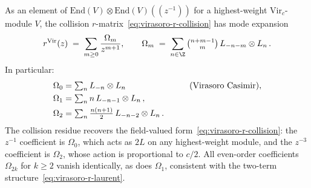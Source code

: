 \begin{proposition}
\label{prop:vir-r-mode-tensor}
As an element of
$\mathrm{End}(V) \otimes \mathrm{End}(V)((z^{-1}))$
for a highest-weight $\mathrm{Vir}_c$-module $V$,
the collision $r$-matrix~\eqref{eq:virasoro-r-collision}
has mode expansion
\begin{equation}\label{eq:vir-r-mode-tensor}
 r^{\mathrm{Vir}}(z)
 \;=\;
 \sum_{m \ge 0}
 \frac{\Omega_m}{z^{m+1}},
 \qquad
 \Omega_m
 \;=\;
 \sum_{n \in \Z}
 \tbinom{n+m-1}{m}\,
 L_{-n-m} \otimes L_n\,.
\end{equation}
In particular:
\begin{alignat}{2}
 \Omega_0 &= \textstyle\sum_{n} L_{-n} \otimes L_n
 &\qquad& \text{\textup{(}Virasoro Casimir\textup{)}},
 \label{eq:vir-casimir-omega0}
 \\
 \Omega_1 &= \textstyle\sum_{n} n\, L_{-n-1} \otimes L_n\,,
 &&
 \label{eq:vir-omega1}
 \\
 \Omega_2 &= \textstyle\sum_{n}
 \tfrac{n(n+1)}{2}\, L_{-n-2} \otimes L_n\,.
 &&
 \label{eq:vir-omega2}
\end{alignat}
The collision residue recovers the field-valued
form~\eqref{eq:virasoro-r-collision}:
the $z^{-1}$ coefficient is $\Omega_0$, which acts as
$2L$ on any highest-weight module, and the $z^{-3}$ coefficient
is $\Omega_2$, whose action is proportional to $c/2$.
All even-order coefficients $\Omega_{2k}$ for $k \ge 2$ vanish
identically, as does $\Omega_1$, consistent with the
two-term structure~\eqref{eq:virasoro-r-laurent}.
\end{proposition}

